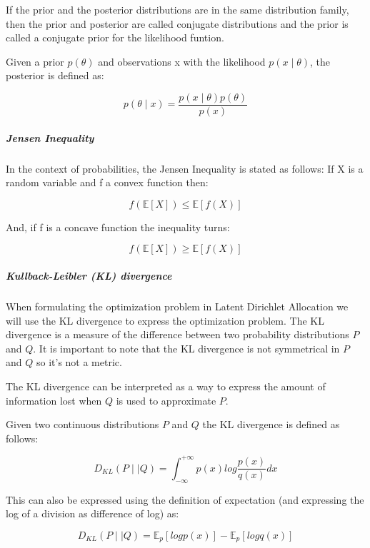\documentclass[12pt]{report}
\begin{document}
If the prior and the posterior distributions are in the same distribution
family, then the prior and posterior are called conjugate distributions and the
prior is called a conjugate prior for the likelihood funtion.

Given a prior $p(\theta)$ and observations x with the likelihood 
$p(x \mid \theta)$, the posterior is defined as:

\begin{equation}
p(\theta \mid x) = \frac{p(x \mid \theta) p(\theta)}{p(x)}
\end{equation}


\subparagraph{Jensen Inequality}

In the context of probabilities, the Jensen Inequality is stated as follows: 
If X is a random variable and f a convex function then:

\begin{equation}
f(\mathbb{E}[X]) \leq \mathbb{E}[f(X)]
\end{equation}

And, if f is a concave function the inequality turns:

\begin{equation}
f(\mathbb{E}[X]) \geq \mathbb{E}[f(X)]
\end{equation}


\subparagraph{Kullback-Leibler (KL) divergence}

When formulating the optimization problem in Latent Dirichlet Allocation we 
will use the KL divergence to express the optimization problem. The KL divergence 
is a measure of the difference between two probability distributions $P$ and $Q$. 
It is important to note
that the KL divergence is not symmetrical in $P$ and $Q$ so it’s not a metric.

The KL divergence can be interpreted as a way to express the amount of 
information lost when $Q$ is used to approximate $P$.

Given two continuous distributions $P$ and $Q$ the KL divergence is defined as follows:

\begin{equation}
D_{KL}(P \mid \mid Q) = \int_{-\infty}^{+\infty} p(x) log\frac{p(x)}{q(x)}dx
\end{equation}

This can also be expressed using the definition of expectation (and expressing the 
log of a division as difference of log) as:

\begin{equation}
D_{KL}(P \mid \mid Q) = \mathbb{E}_{p}[log p(x)] - \mathbb{E}_{p}[log q(x)]
\end{equation}
\end{document}
